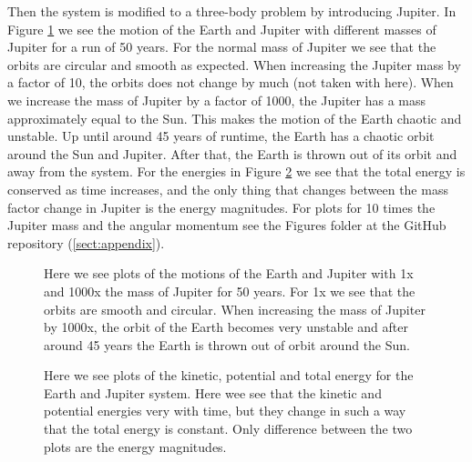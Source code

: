 \documentclass[12pt,a4paper,english]{article}
\begin{document}
Then the system is modified to a three-body problem by introducing Jupiter. In Figure \ref{fig:PosEarthJupiter} we see the motion of the Earth and Jupiter with different masses of Jupiter for a run of 50 years. For the normal mass of Jupiter we see that the orbits are circular and smooth as expected. When increasing the Jupiter mass by a factor of 10, the orbits does not change by much (not taken with here). When we increase the mass of Jupiter by a factor of 1000, the Jupiter has a mass approximately equal to the Sun. This makes the motion of the Earth chaotic and unstable. Up until around 45 years of runtime, the Earth has a chaotic orbit around the Sun and Jupiter. After that, the Earth is thrown out of its orbit and away from the system. For the energies in Figure \ref{fig:EarthJupiterEnergies} we see that the total energy is conserved as time increases, and the only thing that changes between the mass factor change in Jupiter is the energy magnitudes. For plots for 10 times the Jupiter mass and the angular momentum see the Figures folder at the GitHub repository (\ref{sect:appendix}).

\begin{figure}[htbp]
	\hspace{0.5em}
	\caption{Here we see plots of the motions of the Earth and Jupiter with 1x and 1000x the mass of Jupiter for 50 years. For 1x we see that the orbits are smooth and circular. When increasing the mass of Jupiter by 1000x, the orbit of the Earth becomes very unstable and after around 45 years the Earth is thrown out of orbit around the Sun. \label{fig:PosEarthJupiter}}
\end{figure}

\begin{figure}[htbp]
	\hspace{0.5em}
	\caption{Here we see plots of the kinetic, potential and total energy for the Earth and Jupiter system. Here wee see that the kinetic and potential energies very with time, but they change in such a way that the total energy is constant. Only difference between the two plots are the energy magnitudes. \label{fig:EarthJupiterEnergies}}
\end{figure}
\end{document}

